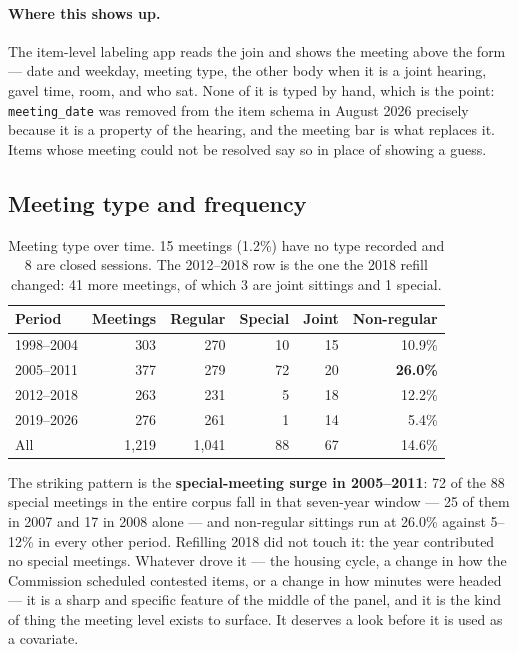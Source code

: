 \documentclass[11pt]{article}
\begin{document}
\paragraph{Where this shows up.} The item-level labeling app reads the join and shows the
meeting above the form --- date and weekday, meeting type, the other body when it is a joint
hearing, gavel time, room, and who sat. None of it is typed by hand, which is the point:
\texttt{meeting\_date} was removed from the item schema in August 2026 precisely because it
is a property of the hearing, and the meeting bar is what replaces it. Items whose meeting
could not be resolved say so in place of showing a guess.

\subsection{Meeting type and frequency}

\begin{table}[h]
\centering
\begin{tabular}{lrrrrr}
\toprule
Period & Meetings & Regular & Special & Joint & Non-regular \\
\midrule
1998--2004 &  303 &  270 & 10 & 15 & 10.9\% \\
2005--2011 &  377 &  279 & 72 & 20 & \textbf{26.0\%} \\
2012--2018 &  263 &  231 &  5 & 18 & 12.2\% \\
2019--2026 &  276 &  261 &  1 & 14 &  5.4\% \\
\midrule
All        & 1{,}219 & 1{,}041 & 88 & 67 & 14.6\% \\
\bottomrule
\end{tabular}
\caption{Meeting type over time. 15 meetings (1.2\%) have no type recorded and 8 are closed
sessions. The 2012--2018 row is the one the 2018 refill changed: 41 more meetings, of which
3 are joint sittings and 1 special.}
\end{table}

\noindent
The striking pattern is the \textbf{special-meeting surge in 2005--2011}: 72 of the 88
special meetings in the entire corpus fall in that seven-year window --- 25 of them in 2007
and 17 in 2008 alone --- and non-regular sittings run at 26.0\% against 5--12\% in every
other period. Refilling 2018 did not touch it: the year contributed no special meetings. Whatever drove it --- the
housing cycle, a change in how the Commission scheduled contested items, or a change in how
minutes were headed --- it is a sharp and specific feature of the middle of the panel, and
it is the kind of thing the meeting level exists to surface. It deserves a look before it is
used as a covariate.
\end{document}
